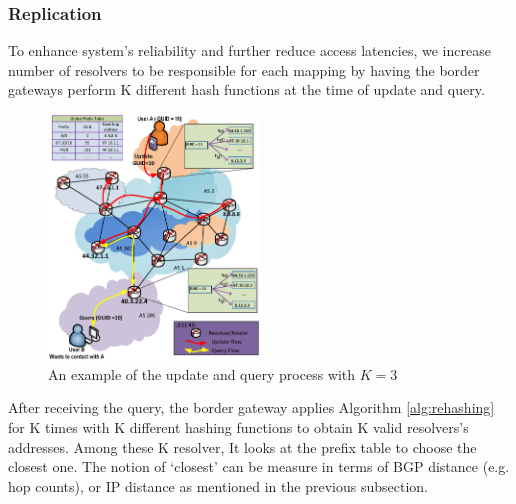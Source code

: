         \subsubsection{Replication}
        \label{subsub:replication}
        To enhance system's reliability and further reduce access latencies, we increase number of resolvers to be responsible for each mapping by having the border gateways perform K different hash functions at the time of update and query.
        \begin{figure}[h]
            \centering
            \includegraphics[width=0.5\textwidth]{figures/DirectHashingApproach.eps}
            \caption{An example of the update and query process with $K=3$ }
            \label{fig:design}
        \end{figure}
        After receiving the query, the border gateway applies Algorithm \ref{alg:rehashing} for K times with K different hashing functions to obtain K valid resolvers's addresses. Among these K resolver, It looks at the prefix table to choose the closest one. The notion of `closest' can be measure in terms of BGP distance (e.g. hop counts), or IP distance as mentioned in the previous subsection.

